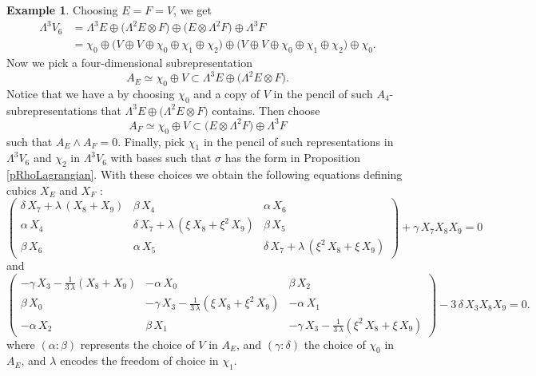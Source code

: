\documentclass[11pt]{amsart}
\theoremstyle{plain}
\numberwithin{equation}{section}
\theoremstyle{definition}
\newtheorem{example}[theorem]{Example}
\theoremstyle{remark}
\begin{document}
\begin{example}
Choosing $E=F=V$, we get 
\begin{align*}
\Lambda^3 V_6 &= \Lambda^3 E 
\oplus \bigl(\Lambda^2 E \otimes F\bigr) 
\oplus \bigl( E \otimes \Lambda^2 F \bigr) \oplus \Lambda^3 F \\
 &= \chi_0 
 \oplus \bigl( V\oplus V 
 \oplus \chi_0 \oplus \chi_1 \oplus \chi_2 \bigr) 
 \oplus \bigl( V\oplus V 
 \oplus \chi_0 \oplus \chi_1 \oplus \chi_2 \bigr) 
 \oplus \chi_0 .
\end{align*}
Now we pick a four-dimensional subrepresentation  \[ A_E \simeq \chi_0 \oplus V \subset \Lambda^3 E \oplus \bigl(\Lambda^2 E \otimes F\bigr). \]
Notice that we have a 
by choosing $\chi_0$ and a copy of $V$ in the pencil of such $A_4$-subrepresentations that $\Lambda^3 E \oplus \bigl(\Lambda^2 E \otimes F\bigr)$ contains. Then choose 
\[ A_F\simeq \chi_0 \oplus V \subset  \bigl( E \otimes \Lambda^2 F \bigr) \oplus \Lambda^3 F\] such that $A_E \wedge A_F =0.$ Finally, pick $\chi_1$ in the pencil of such representations in $\Lambda^3 V_6$ and $\chi_2$ in $\Lambda^3 V_6$ with bases such that $\sigma$ has the form in Proposition \ref{pRhoLagrangian}. With these choices we obtain the following equations defining  cubics $X_E$ and $X_F$ \cite[Sections5-8.m2]{MacaulayFiles}:
\[
\left(\!\begin{array}{ccc}
       \delta\,X_{7}+\lambda\,(X_{8}+X_{9})
       &\beta\,X_{4}
       &\alpha\,X_{6}
       \\
       \alpha\,X_{4}
       &\delta\,X_{7}+\lambda\,(\xi\, X_{8}+\xi^2\,X_{9})
       &\beta\,X_{5}
       \\
       \beta\,X_{6}
       &\alpha\,X_{5}
       &\delta\,X_{7}+\lambda\,(\xi^2\,X_{8}+\xi\,X_{9})
       \end{array}
\!\right)+\gamma\,X_{7}X_{8}X_{9} =0 
\]
and 
\[
       \left(\!\begin{array}{ccc}
       -\gamma\,X_{3}-\frac{1}{3\,\lambda}(X_{8}+X_{9})
       &-\alpha\,X_{0}
       &\beta\,X_{2}
       \\
       \beta\,X_{0}
       &-\gamma\,X_{3}-\frac{1}{3\,\lambda}(\xi\,X_{8}+\xi^2\,X_{9})
       &-\alpha\,X_{1}
       \\
       -\alpha\,X_{2}
       &\beta\,X_{1}
       &-\gamma\,X_{3}-\frac{1}{3\,\lambda}(\xi^2\,X_{8}+\xi\,X_{9})
       \end{array}\!\right)
       -3\,\delta\,X_{3}X_{8}X_{9} =0 . 
\]
where $(\alpha : \beta)$ represents the choice of $V$ in $A_E$, and $(\gamma : \delta )$ the choice of $\chi_0$ in $A_E$, and $\lambda$ encodes the freedom of choice in $\chi_1$. 


\end{example}
\end{document}

